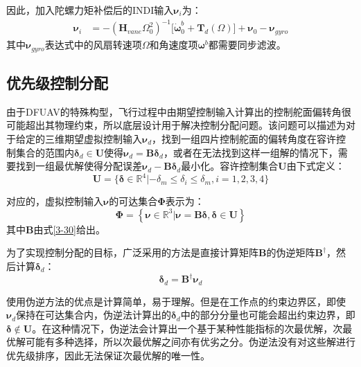 因此，加入陀螺力矩补偿后的INDI输入$\boldsymbol{\nu}_i$为：
\begin{equation}
    \begin{aligned}
        \boldsymbol{\nu}_i&=-(\boldsymbol{H}_{vane}\Omega_0^2)^{-1} \big[\boldsymbol{\dot{\omega}}_0^b+\boldsymbol{T}_d(\Omega)\big]+\boldsymbol{\nu}_0-\boldsymbol{\nu}_{gyro}
    \end{aligned}
    \label{3-54}
\end{equation}
其中$\boldsymbol{\nu}_{gyro}$表达式中的风扇转速项$\Omega$和角速度项$\boldsymbol{\omega}^b$都需要同步滤波。

\subsection{优先级控制分配}

由于DFUAV的特殊构型，飞行过程中由期望控制输入计算出的控制舵面偏转角很可能超出其物理约束，所以底层设计用于解决控制分配问题。该问题可以描述为对于给定的三维期望虚拟控制输入$\boldsymbol{\nu}_d$，找到一组四片控制舵面的偏转角度在容许控制集合的范围内$\boldsymbol{\delta}_d\in \boldsymbol{U}$使得$\boldsymbol{\nu}_d=\boldsymbol{B}\boldsymbol{\delta}_d$，或者在无法找到这样一组解的情况下，需要找到一组最优解使得分配误差$\boldsymbol{\nu}_d-\boldsymbol{B}\boldsymbol{\delta}_d$最小化。容许控制集合$\boldsymbol{U}$由下式定义：
\begin{equation}
    \boldsymbol{U}=\{\boldsymbol{\delta}\in\mathbb{R}^4|-\delta_m\leq\delta_i\leq\delta_m,i=1,2,3,4\}
    \label{3-55}
\end{equation}

对应的，虚拟控制输入$\boldsymbol{\nu}$的可达集合$\boldsymbol\Phi$表示为：
\begin{equation}
    \boldsymbol\Phi=\left\{\boldsymbol{\nu}\in\mathbb{R}^3|\boldsymbol{\nu}=\boldsymbol{B}\boldsymbol{\delta},\boldsymbol{\delta}\in \boldsymbol{U}\right\}
    \label{3-56}
\end{equation}
其中$\boldsymbol{B}$由式\eqref{3-30}给出。

为了实现控制分配的目标，广泛采用的方法是直接计算矩阵$\boldsymbol{B}$的伪逆矩阵$\boldsymbol{B}^{\dagger}$，然后计算$\boldsymbol{\delta}_d$：
\begin{equation}
    \boldsymbol{\delta}_d=\boldsymbol{B}^{\dagger}\boldsymbol{\nu}_d
    \label{3-57}
\end{equation}

使用伪逆方法的优点是计算简单，易于理解。但是在工作点的约束边界区，即使$\boldsymbol{\nu}_d$保持在可达集合内，伪逆法计算出的$\boldsymbol{\delta}_d$中的部分分量也可能会超出约束边界，即$\boldsymbol{\delta}\notin\boldsymbol{U}$。在这种情况下，伪逆法会计算出一个基于某种性能指标的次最优解，次最优解可能有多种选择，所以次最优解之间亦有优劣之分。伪逆法没有对这些解进行优先级排序，因此无法保证次最优解的唯一性。

